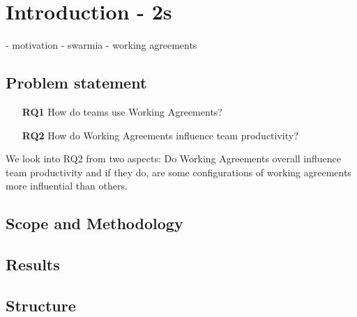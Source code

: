 
\chapter{Introduction - 2s}

- motivation
- swarmia
- working agreements

\section{Problem statement}

\begin{enumerate}
    \item[{\bf RQ1}] How do teams use Working Agreements?
    \item[{\bf RQ2}] How do Working Agreements influence team productivity?
\end{enumerate}

We look into RQ2 from two aspects: Do Working Agreements overall influence team productivity and if they do, are some configurations of working agreements more influential than others. 

\section{Scope and Methodology}

\section{Results}

\section{Structure}
